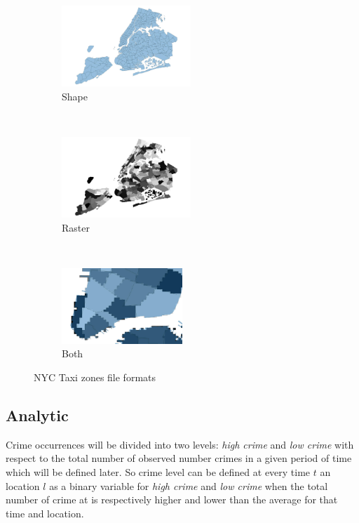 \documentclass{sigkddExp}
\begin{document}
\begin{figure}
    \centering
    \begin{subfigure}[t]{0.25\textwidth}
        \centering
        \includegraphics[height=1.2in]{images/taxi_zones_shape}
        \caption{Shape}
        \label{fig:zones_shape}
    \end{subfigure}%
    ~ 
    \begin{subfigure}[t]{0.25\textwidth}
        \centering
        \includegraphics[height=1.2in]{images/taxi_zones_raster}
        \caption{Raster}
        \label{fig:zones_raster}
    \end{subfigure}
    ~ 
    \begin{subfigure}[t]{0.5\textwidth}
        \centering
        \includegraphics[width=0.5\textwidth]{images/both}
        \caption{Both}
        \label{fig:zones_both}
    \end{subfigure}
    \caption{NYC Taxi zones file formats}
    \label{fig:zones}
\end{figure}


\subsection{Analytic}

Crime occurrences will be divided into  two levels: \textit{high crime} and  \textit{low crime} with respect to the total number of observed number crimes in a given period of time which will be defined later.
So crime level can be defined at every time $t$ an location $l$ as a binary variable for \textit{high crime} and \textit{low crime} when the total number of crime at is respectively higher and lower  than the average for that time and location.
\end{document}
